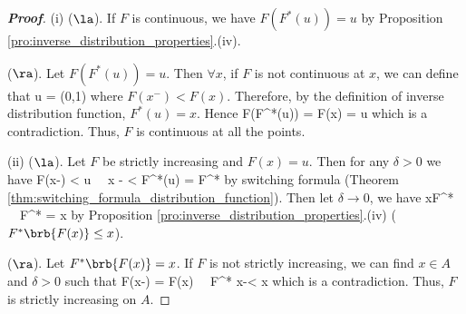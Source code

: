 \begin{proof}[\bf Proof]
\ben
\item [(i)] ($\la$). If $F$ is continuous, we have $F(F^*(u)) = u$ by Proposition \ref{pro:inverse_distribution_properties}.(iv).


($\ra$). Let $F(F^*(u)) = u$. Then $\forall x$, if $F$ is not continuous at $x$, we can define that
\be
u =   \in (0,1)
\ee
where $F(x^-)< F(x)$. Therefore, by the definition of inverse distribution function, $F^*(u) =x$. Hence
\be
F(F^*(u)) = F(x) \neq{}  = u
\ee
which is a contradiction. Thus, $F$ is continuous at all the points.

\item [(ii)] ($\la$). Let $F$ be strictly increasing and $F(x) = u$. Then for any $\delta>0$ we have
\be
F(x-\delta) < u \ \ra\ x - \delta < F^*(u) = F^*
\ee
by switching formula (Theorem \ref{thm:switching_formula_distribution_function}). Then let $\delta \to 0$, we have
\be
x\leq F^* \ \ra\ F^* = x
\ee
by Proposition \ref{pro:inverse_distribution_properties}.(iv) ($F^*\brb{F(x)} \leq x$).

($\ra$). Let $F^*\brb{F(x)} = x$. If $F$ is not strictly increasing, we can find $x\in A$ and $\delta>0$ such that
\be
F(x-\delta) = F(x) \ \ra\ F^* \leq x-\delta < x
\ee
which is a contradiction. Thus, $F$ is strictly increasing on $A$.
\een
\end{proof}


%
%
%





